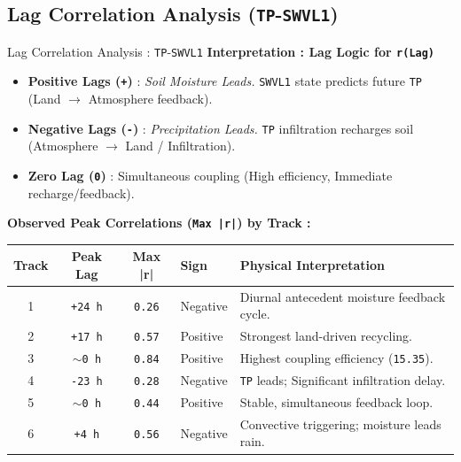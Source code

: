 \documentclass[8pt, aspectratio=169]{beamer}
\begin{document}
\subsection{Lag Correlation Analysis (\texttt{TP}-\texttt{SWVL1})}
\begin{frame}{Lag Correlation Analysis : \texttt{TP}-\texttt{SWVL1}}
    \footnotesize
    \textbf{Interpretation : Lag Logic for \texttt{r(Lag)}}
    \begin{itemize}
        \item \textbf{Positive Lags (\texttt{+})} : \textit{Soil Moisture Leads.} \texttt{SWVL1} state predicts future \texttt{TP} (Land $\rightarrow$ Atmosphere feedback).
        \item \textbf{Negative Lags (\texttt{-})} : \textit{Precipitation Leads.} \texttt{TP} infiltration recharges soil (Atmosphere $\rightarrow$ Land / Infiltration).
        \item \textbf{Zero Lag (\texttt{0})} : Simultaneous coupling (High efficiency, Immediate recharge/feedback).
    \end{itemize}

    \vspace{0.2cm}
    \footnotesize
    \textbf{Observed Peak Correlations (\texttt{Max |r|}) by Track :}
    \begin{center}
        \footnotesize
        \begin{tabular}{c c c l p{5cm}}
            \toprule
            \textbf{Track} & \textbf{Peak Lag} & \textbf{Max |r|} & \textbf{Sign} & \textbf{Physical Interpretation} \\
            \midrule
            1 & \texttt{+24 h} & \texttt{0.26} & Negative & Diurnal antecedent moisture feedback cycle. \\
            2 & \texttt{+17 h} & \texttt{0.57} & Positive & Strongest land-driven recycling. \\
            3 & \texttt{$\sim$0 h} & \texttt{0.84} & Positive & Highest coupling efficiency (\texttt{15.35}). \\
            4 & \texttt{-23 h} & \texttt{0.28} & Negative & \texttt{TP} leads; Significant infiltration delay. \\
            5 & \texttt{$\sim$0 h} & \texttt{0.44} & Positive & Stable, simultaneous feedback loop. \\
            6 & \texttt{+4 h} & \texttt{0.56} & Negative & Convective triggering; moisture leads rain. \\
            \bottomrule
        \end{tabular}
    \end{center}


\end{frame}
\end{document}
